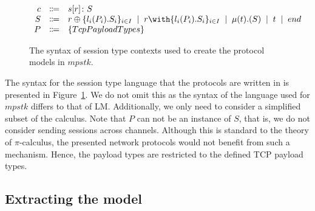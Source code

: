 \documentclass{article}
\newcommand{\sep}{\;\mid\;}
\begin{document}
\begin{figure}[H]
    \centering
        $
        \begin{array}{rcl}
        \ensuremath{c}
            & \Coloneqq & \ensuremath{s[r] \colon S} \cr
        \ensuremath{S}
            & \Coloneqq & \ensuremath{r \oplus \{l_i(P_i).S_i\}_{i \in I}}
            \sep        \ensuremath{r \with \{l_i(P_i).S_i\}_{i \in I}}
            \sep        \ensuremath{\mu(t).(S)}
            \sep        \ensuremath{t}
            \sep        \ensuremath{end} \cr
        \ensuremath{P}
            & \Coloneqq & \ensuremath{\{TcpPayloadTypes\}}
        \end{array}
        $
    \caption{The syntax of session type contexts used to create the protocol models in \ensuremath{mpstk}.}
    \label{fig:syntax}
\end{figure}

The syntax for the session type language that the protocols are written in is presented in Figure~\ref{fig:syntax}.
We do not omit this as the syntax of the language used for \ensuremath{mpstk} differs to that of LM.
Additionally, we only need to consider a simplified subset of the calculus.
Note that \ensuremath{P} can not be an instance of \ensuremath{S}, that is, we do not consider sending sessions across channels.
Although this is standard to the theory of \ensuremath{\pi}-calculus, the presented network protocols would not benefit from such a mechanism.
Hence, the payload types are restricted to the defined TCP payload types.

\subsection{Extracting the model}
\end{document}

